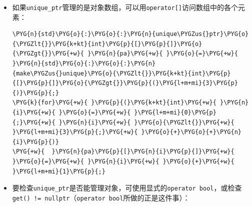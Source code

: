 \begin{itemize}
\begin{codeblockbg}
\begin{Verbatim}[commandchars=\\\{\},breaklines=true,breakanywhere=true,fontsize=\codefont,xleftmargin=17bp]
\PYG{k}{auto}\PYG{+w}{ }\PYG{n}{pi}\PYG{+w}{ }\PYG{o}{=}\PYG{+w}{ }\PYG{n}{std}\PYG{o}{:}\PYG{o}{:}\PYG{n}{make\PYGZus{}unique}\PYG{o}{\PYGZlt{}}\PYG{k+kt}{int}\PYG{o}{\PYGZgt{}}\PYG{p}{(}\PYG{l+m+mi}{42}\PYG{p}{)}\PYG{p}{;}
\PYG{o}{*}\PYG{n}{pi}\PYG{+w}{ }\PYG{o}{=}\PYG{+w}{ }\PYG{l+m+mi}{21}\PYG{p}{;}
\PYG{k}{auto}\PYG{+w}{ }\PYG{n}{pf}\PYG{+w}{ }\PYG{o}{=}\PYG{+w}{ }\PYG{n}{std}\PYG{o}{:}\PYG{o}{:}\PYG{n}{make\PYGZus{}unique}\PYG{o}{\PYGZlt{}}\PYG{n}{foo}\PYG{o}{\PYGZgt{}}\PYG{p}{(}\PYG{p}{)}\PYG{p}{;}
\PYG{n}{pf}\PYG{o}{\PYGZhy{}}\PYG{o}{\PYGZgt{}}\PYG{n}{print}\PYG{p}{(}\PYG{p}{)}\PYG{p}{;}
\end{Verbatim}
\end{codeblockbg}



\item 如果\texttt{unique\_\allowbreak{}ptr}管理的是对象数组，可以用\texttt{operator[]}访问数组中的各个元素：



\begin{codeblockbg}
\begin{Verbatim}[commandchars=\\\{\},breaklines=true,breakanywhere=true,fontsize=\codefont,xleftmargin=17bp]
\PYG{n}{std}\PYG{o}{:}\PYG{o}{:}\PYG{n}{unique\PYGZus{}ptr}\PYG{o}{\PYGZlt{}}\PYG{k+kt}{int}\PYG{p}{[}\PYG{p}{]}\PYG{o}{\PYGZgt{}}\PYG{+w}{ }\PYG{n}{pa}\PYG{+w}{ }\PYG{o}{=}\PYG{+w}{ }\PYG{n}{std}\PYG{o}{:}\PYG{o}{:}\PYG{n}{make\PYGZus{}unique}\PYG{o}{\PYGZlt{}}\PYG{k+kt}{int}\PYG{p}{[}\PYG{p}{]}\PYG{o}{\PYGZgt{}}\PYG{p}{(}\PYG{l+m+mi}{3}\PYG{p}{)}\PYG{p}{;}
\PYG{k}{for}\PYG{+w}{ }\PYG{p}{(}\PYG{k+kt}{int}\PYG{+w}{ }\PYG{n}{i}\PYG{+w}{ }\PYG{o}{=}\PYG{+w}{ }\PYG{l+m+mi}{0}\PYG{p}{;}\PYG{+w}{ }\PYG{n}{i}\PYG{+w}{ }\PYG{o}{\PYGZlt{}}\PYG{+w}{ }\PYG{l+m+mi}{3}\PYG{p}{;}\PYG{+w}{ }\PYG{o}{+}\PYG{o}{+}\PYG{n}{i}\PYG{p}{)}
\PYG{+w}{  }\PYG{n}{pa}\PYG{p}{[}\PYG{n}{i}\PYG{p}{]}\PYG{+w}{ }\PYG{o}{=}\PYG{+w}{ }\PYG{n}{i}\PYG{+w}{ }\PYG{o}{+}\PYG{+w}{ }\PYG{l+m+mi}{1}\PYG{p}{;}
\end{Verbatim}
\end{codeblockbg}



\item 要检查\texttt{unique\_\allowbreak{}ptr}是否能管理对象，可使用显式的\texttt{operator bool}，或检查\texttt{get() != nullptr}（\texttt{operator bool}所做的正是这件事）：



\end{itemize}
